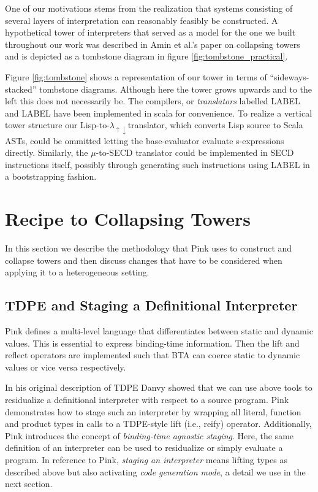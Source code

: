 \documentclass[a4paper,12pt,twoside,openright]{report}
\theoremstyle{definition}
\newcommand{\mslang}{$\lambda_{\uparrow\downarrow}$}
\begin{document}
One of our motivations stems from the realization that systems consisting of several layers of interpretation can reasonably feasibly be constructed. A hypothetical tower of interpreters that served as a model for the one we built throughout our work was described in Amin et al.'s paper on collapsing towers \cite{amin2017collapsing} and is depicted as a tombstone diagram in figure \ref{fig:tombstone_practical}.

Figure \ref{fig:tombstone} shows a representation of our tower in terms of ``sideways-stacked'' tombstone diagrams. Although here the tower grows upwards and to the left this does not necessarily be. The compilers, or \textit{translators} labelled LABEL and LABEL have been implemented in scala for convenience. To realize a vertical tower structure our Lisp-to-\mslang translator, which converts Lisp source to Scala ASTs, could be ommitted letting the base-evaluator evaluate s-expressions directly. Similarly, the $\mu$-to-SECD translator could be implemented in SECD instructions itself, possibly through generating such instructions using LABEL in a bootstrapping fashion.

\section{Recipe to Collapsing Towers}
In this section we describe the methodology that Pink uses to construct and collapse towers and then discuss changes that have to be considered when applying it to a heterogeneous setting.

\subsection{TDPE and Staging a Definitional Interpreter}\label{subsec:stage_def_interp}
Pink defines a multi-level language that differentiates between static and dynamic values. This is essential to express binding-time information. Then the lift and reflect operators are implemented such that BTA can coerce static to dynamic values or vice versa respectively.

In his original description of TDPE  Danvy \cite{danvy1999type} showed that we can use above tools to residualize a definitional interpreter with respect to a source program. Pink demonstrates how to stage such an interpreter by wrapping all literal, function and product types in calls to a TDPE-style lift (i.e., reify) operator. Additionally, Pink introduces the concept of \textit{binding-time agnostic staging}. Here, the same definition of an interpreter can be used to residualize or simply evaluate a program. In reference to Pink, \textit{staging an interpreter} means lifting types as described above but also activating \textit{code generation mode}, a detail we use in the next section.
\end{document}
